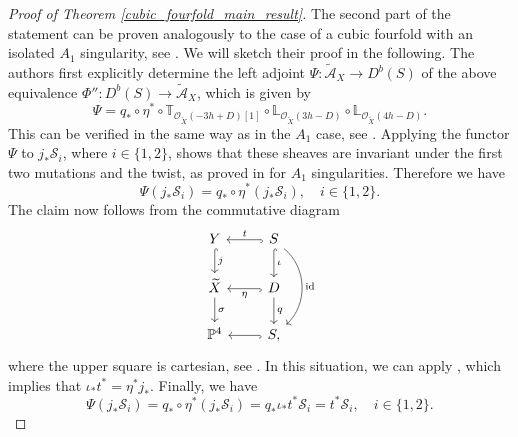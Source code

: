 \documentclass[a4paper, twoside, 11pt]{amsart}
\theoremstyle{definition}
\theoremstyle{remark}
\numberwithin{equation}{theorem}
\DeclareMathOperator{\id}{id}
\begin{document}
\begin{proof}[Proof of Theorem \ref{cubic_fourfold_main_result}]
    The second part of the statement can be proven analogously to the case of a cubic fourfold with an isolated $A_1$ singularity, see \cite[§4]{Kernels_nodal}. We will sketch their proof in the following. The authors first explicitly determine the left adjoint $\Psi\colon \widetilde{\mathcal{A}}_X \to D^b(S)$ of the above equivalence $\Phi''\colon D^b(S) \to \widetilde{\mathcal{A}}_X$, which is 
    given by
     \begin{equation*}
        \Psi= q_* \circ \eta^* \circ \mathbb{T}_{\mathcal{O}_{\widetilde{X}}(-3h+D)[1]} \circ \mathbb{L}_{\mathcal{O}_{\widetilde{X}}(3h-D)} \circ \mathbb{L}_{\mathcal{O}_{\widetilde{X}}(4h-D)}.
    \end{equation*}
    This can be verified in the same way as in the $A_1$ case, see \cite[Proposition 4.3]{Kernels_nodal}. Applying the functor $\Psi$ to $j_*\mathcal{S}_i$, where $i \in \{1,2\}$, shows that these sheaves are invariant under the first two mutations and the twist, as proved in \cite[Proposition 4.4]{Kernels_nodal} for $A_1$ singularities. Therefore we have 
    \begin{equation*}
        \Psi(j_*\mathcal{S}_i) = q_* \circ \eta^*(j_*\mathcal{S}_i), \quad i \in \{1,2\}.
    \end{equation*}
    The claim now follows from the commutative diagram 
    \begin{equation*}
        \begin{tikzcd}
        Y \arrow[d, "j", hook]            & S \arrow[l, "t"', hook] \arrow[d, "\iota", hook] \arrow[dd, "\id", bend left=49] \\
        \widetilde{X} \arrow[d, "\sigma"] & D \arrow[d, "q"] \arrow[l, "\eta", hook]                                         \\
        \mathbb{P}^4                      & S, \arrow[l, hook]                                \end{tikzcd}
    \end{equation*}
    where the upper square is cartesian, see \cite[Lemma 4.1]{Kernels_nodal}. In this situation, we can apply \cite[Proposition 2.29]{Kernels_nodal}, which implies that $\iota_*t^* = \eta^*j_*$. Finally, we have 
    \begin{equation*}
        \Psi(j_*\mathcal{S}_i) = q_* \circ \eta^*(j_*\mathcal{S}_i) = q_* \iota_*t^*\mathcal{S}_i = t^*\mathcal{S}_i, \quad i \in \{1,2\}.
    \end{equation*}
\end{proof} 




\clearpage
\printbibliography
\end{document}
